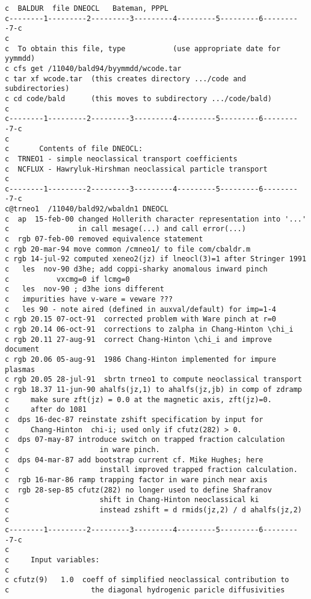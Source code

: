 \begin{verbatim}
c  BALDUR  file DNEOCL   Bateman, PPPL
c--------1---------2---------3---------4---------5---------6---------7-c
c
c  To obtain this file, type           (use appropriate date for yymmdd)
c cfs get /11040/bald94/byymmdd/wcode.tar
c tar xf wcode.tar  (this creates directory .../code and subdirectories)
c cd code/bald      (this moves to subdirectory .../code/bald)
c
c--------1---------2---------3---------4---------5---------6---------7-c
c
c       Contents of file DNEOCL:
c  TRNEO1 - simple neoclassical transport coefficients
c  NCFLUX - Hawryluk-Hirshman neoclassical particle transport
c
c--------1---------2---------3---------4---------5---------6---------7-c
c@trneo1  /11040/bald92/wbaldn1 DNEOCL
c  ap  15-feb-00 changed Hollerith character representation into '...' 
c                in call mesage(...) and call error(...)
c  rgb 07-feb-00 removed equivalence statement
c rgb 20-mar-94 move common /cmneo1/ to file com/cbaldr.m
c rgb 14-jul-92 computed xeneo2(jz) if lneocl(3)=1 after Stringer 1991
c   les  nov-90 d3he; add coppi-sharky anomalous inward pinch
c           vxcmg=0 if lcmg=0
c   les  nov-90 ; d3he ions different
c   impurities have v-ware = veware ???
c   les 90 - note aired (defined in auxval/default) for imp=1-4
c rgb 20.15 07-oct-91  corrected problem with Ware pinch at r=0
c rgb 20.14 06-oct-91  corrections to zalpha in Chang-Hinton \chi_i
c rgb 20.11 27-aug-91  correct Chang-Hinton \chi_i and improve document
c rgb 20.06 05-aug-91  1986 Chang-Hinton implemented for impure plasmas
c rgb 20.05 28-jul-91  sbrtn trneo1 to compute neoclassical transport
c rgb 18.37 11-jun-90 ahalfs(jz,1) to ahalfs(jz,jb) in comp of zdramp
c     make sure zft(jz) = 0.0 at the magnetic axis, zft(jz)=0. 
c     after do 1081
c  dps 16-dec-87 reinstate zshift specification by input for 
c     Chang-Hinton  chi-i; used only if cfutz(282) > 0.
c  dps 07-may-87 introduce switch on trapped fraction calculation
c                     in ware pinch.
c  dps 04-mar-87 add bootstrap current cf. Mike Hughes; here
c                     install improved trapped fraction calculation.
c  rgb 16-mar-86 ramp trapping factor in ware pinch near axis
c  rgb 28-sep-85 cfutz(282) no longer used to define Shafranov
c                     shift in Chang-Hinton neoclassical ki
c                     instead zshift = d rmids(jz,2) / d ahalfs(jz,2)
c
c--------1---------2---------3---------4---------5---------6---------7-c
c
c     Input variables:
c
c cfutz(9)   1.0  coeff of simplified neoclassical contribution to
c                   the diagonal hydrogenic paricle diffusivities

\end{verbatim}
